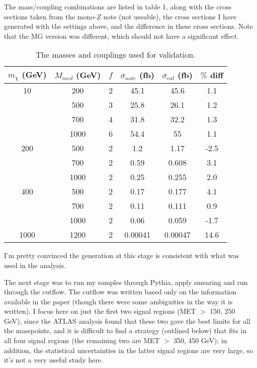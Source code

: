 \begin{flushleft}
The mass/coupling combinations are listed in table 1, along with the cross sections taken from the mono-$Z$ note (not useable), the cross sections I have generated with the settings above, and the difference in these cross sections. Note that the MG version was different, which should not have a significant effect.

\begin{table}
\begin{center}
\begin{tabular}{| c | c | c || c | c | c |}
\hline
$m_{\chi}$ (GeV) & $M_{med}$ (GeV) & $f$ & $\sigma_{note}$ (fb) &  $\sigma_{val}$ (fb) & $\%$ diff \\
\hline
\hline
10 & 200 & 2 & 45.1 & 45.6 & 1.1 \\
 & 500 & 3 & 25.8 & 26.1 & 1.2 \\
 & 700 & 4 & 31.8 & 32.2 & 1.3 \\
 & 1000 & 6 & 54.4 & 55 & 1.1 \\
200 & 500 & 2 & 1.2 & 1.17 & -2.5 \\
 & 700 & 2 & 0.59 & 0.608 & 3.1 \\
 & 1000 & 2 & 0.25 & 0.255 & 2.0 \\
400 & 500 & 2 & 0.17 & 0.177 & 4.1 \\
 & 700 & 2 & 0.11 & 0.111 & 0.9 \\
 & 1000 & 2 & 0.06 & 0.059 & -1.7 \\
1000 & 1200 & 2 & 0.00041 & 0.00047 & 14.6 \\
\hline
\end{tabular}
\end{center}
\caption{The masses and couplings used for validation.}
\end{table}

\bigskip
I'm pretty convinced the generation at this stage is consistent with what was used in the analysis.

\bigskip
The next stage was to run my samples through Pythia, apply smearing and run through the cutflow. The cutflow was written based only on the information available in the paper (though there were some ambiguities in the way it is written). I focus here on just the first two signal regions (MET $>$ 150, 250 GeV), since the ATLAS analysis found that these two gave the best limits for all the masspoints, and it is difficult to find a strategy (outlined below) that fits in all four signal regions (the remaining two are MET $>$ 350, 450 GeV); in addition, the statistical uncertainties in the latter signal regions are very large, so it's not a very useful study here.


\end{flushleft}
